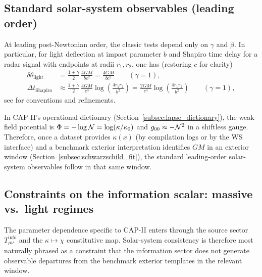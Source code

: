 \subsection{Standard solar-system observables (leading order)}
\label{app:ppn_observables}

At leading post-Newtonian order, the classic tests depend only on $\gamma$ and $\beta$.
In particular, for light deflection at impact parameter $b$ and Shapiro time delay for a radar signal with endpoints at radii $r_1,r_2$, one has (restoring $c$ for clarity)
\begin{align}
  \delta\theta_{\mathrm{light}}
  &= \frac{1+\gamma}{2}\,\frac{4GM}{b c^2}
  = \frac{4GM}{b c^2}
  \qquad (\gamma=1),\\
  \Delta t_{\mathrm{Shapiro}}
  &\approx \frac{1+\gamma}{2}\,\frac{4GM}{c^3}\log\!\left(\frac{4r_1 r_2}{b^2}\right)
  = \frac{2GM}{c^3}\log\!\left(\frac{4r_1 r_2}{b^2}\right)
  \qquad (\gamma=1),
\end{align}
see \cite{Shapiro1964,Will1993,Will2014} for conventions and refinements.
\par
\noindent In CAP-II's operational dictionary (Section~\ref{subsec:lapse_dictionary}), the weak-field potential is $\Phi=-\log\mathcal{N}=\log(\kappa/\kappa_0)$ and $g_{00}\approx-\mathcal{N}^2$ in a shiftless gauge.
Therefore, once a dataset provides $\kappa(x)$ (by compilation logs or by the WS interface) and a benchmark exterior interpretation identifies $GM$ in an exterior window (Section~\ref{subsec:schwarzschild_fit}), the standard leading-order solar-system observables follow in that same window.

\subsection{Constraints on the information scalar: massive vs.\ light regimes}
\label{app:ppn_constraints_on_scalar}

The parameter dependence specific to CAP-II enters through the source sector $T^{\mathrm{info}}_{\mu\nu}$ and the $\kappa\mapsto\chi$ constitutive map.
Solar-system consistency is therefore most naturally phrased as a constraint that the information sector does not generate observable departures from the benchmark exterior templates in the relevant window.

